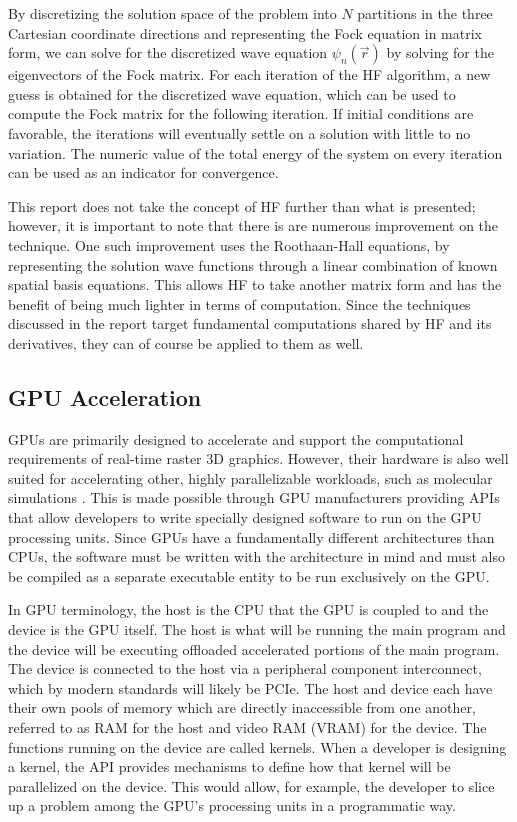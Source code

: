\documentclass[conference, twoside]{IEEEtran}
\begin{document}
By discretizing the solution space of the problem into $N$ partitions in the three Cartesian coordinate directions and representing the Fock equation in matrix form, we can solve for the discretized wave equation $\psi_n(\vec{r})$ by solving for the eigenvectors of the Fock matrix. For each iteration of the HF algorithm, a new guess is obtained for the discretized wave equation, which can be used to compute the Fock matrix for the following iteration. If initial conditions are favorable, the iterations will eventually settle on a solution with little to no variation. The numeric value of the total energy of the system on every iteration can be used as an indicator for convergence.

This report does not take the concept of HF further than what is presented; however, it is important to note that there is are numerous improvement on the technique. One such improvement uses the Roothaan-Hall equations, by representing the solution wave functions through a linear combination of known spatial basis equations. This allows HF to take another matrix form and has the benefit of being much lighter in terms of computation. Since the techniques discussed in the report target fundamental computations shared by HF and its derivatives, they can of course be applied to them as well.

\subsection{GPU Acceleration} %

GPUs are primarily designed to accelerate and support the computational requirements of real-time raster 3D graphics. However, their hardware is also well suited for accelerating other, highly parallelizable workloads, such as molecular simulations \cite{electronic-structure-calculations-on-gpus}. This is made possible through GPU manufacturers providing APIs that allow developers to write specially designed software to run on the GPU processing units. Since GPUs have a fundamentally different architectures than CPUs, the software must be written with the architecture in mind and must also be compiled as a separate executable entity to be run exclusively on the GPU.

In GPU terminology, the host is the CPU that the GPU is coupled to and the device is the GPU itself. The host is what will be running the main program and the device will be executing offloaded accelerated portions of the main program. The device is connected to the host via a peripheral component interconnect, which by modern standards will likely be PCIe. The host and device each have their own pools of memory which are directly inaccessible from one another, referred to as RAM for the host and video RAM (VRAM) for the device. The functions running on the device are called kernels. When a developer is designing a kernel, the API provides mechanisms to define how that kernel will be parallelized on the device. This would allow, for example, the developer to slice up a problem among the GPU's processing units in a programmatic way.
\end{document}
